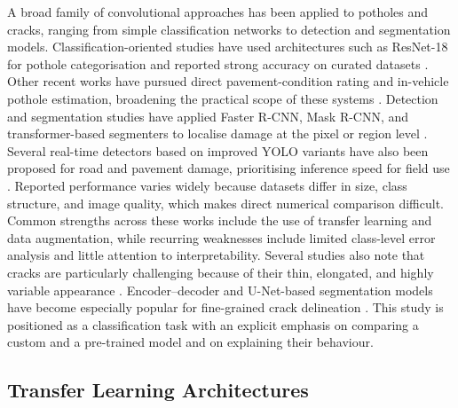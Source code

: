 \documentclass[preprint,12pt]{elsarticle}
\begin{document}
A broad family of convolutional approaches has been applied to potholes and cracks, ranging from simple classification networks to detection and segmentation models.
Classification-oriented studies have used architectures such as ResNet-18 for pothole categorisation and reported strong accuracy on curated datasets \cite{naik2023pothole, murty2024detection}.
Other recent works have pursued direct pavement-condition rating and in-vehicle pothole estimation, broadening the practical scope of these systems \cite{qureshi2023deep, ruseruka2024augmenting}.
Detection and segmentation studies have applied Faster R-CNN, Mask R-CNN, and transformer-based segmenters to localise damage at the pixel or region level \cite{li2024road, kulambayev2023realtime, guo2023pavement}.
Several real-time detectors based on improved YOLO variants have also been proposed for road and pavement damage, prioritising inference speed for field use \cite{sami2023improved, xing2023improved, wang2024research}.
Reported performance varies widely because datasets differ in size, class structure, and image quality, which makes direct numerical comparison difficult.
Common strengths across these works include the use of transfer learning and data augmentation, while recurring weaknesses include limited class-level error analysis and little attention to interpretability.
Several studies also note that cracks are particularly challenging because of their thin, elongated, and highly variable appearance \cite{tabernik2023automated, zhu2024lightweight}.
Encoder--decoder and U-Net-based segmentation models have become especially popular for fine-grained crack delineation \cite{dibenedetto2023unet, saberironaghi2024depthcracknet}.
This study is positioned as a classification task with an explicit emphasis on comparing a custom and a pre-trained model and on explaining their behaviour.

\subsection{Transfer Learning Architectures}
\end{document}
